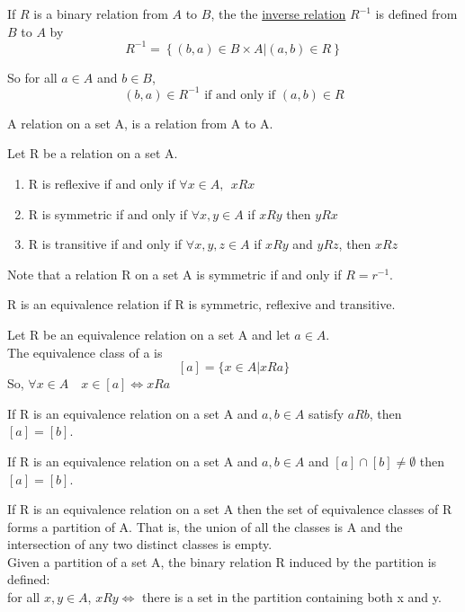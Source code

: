\begin{definition}
    If $R$ is a binary relation from $A$ to $B$, the the \underline{inverse relation} $R^{-1}$ is defined from $B$ to $A$ by $$R^{-1} = \left\{(b,a)\in B\times A | (a,b)\in R\right\}$$

    So for all $a\in A$ and $b\in B$, $$(b,a)\in R^{-1} \text{ if and only if }(a,b)\in R$$
\end{definition}
A relation on a set A, is a relation from A to A.\\
\newpage
\begin{definition}
    Let R be a relation on a set A.\\
    \begin{enumerate}
        \item R is reflexive if and only if \(\forall x \in A, ~~xRx\)
        \item R is symmetric if and only if \(\forall x,y \in A\) if \(xRy\) then \(yRx\)
        \item R is transitive if and only if \(\forall x,y,z \in A\) if \(xRy\) and \(yRz\), then \(xRz\)
    \end{enumerate}
\end{definition}
Note that a relation R on a set A is symmetric if and only if \(R = r^{-1}\).\\
\begin{definition}
    R is an equivalence relation if R is symmetric, reflexive and transitive.
\end{definition}
\begin{definition}
    Let R be an equivalence relation on a set A and let \(a \in A\).\\
    The equivalence class of a is \[[a] = \{x\in A | xRa\}\]
    So, \(\forall x\in A\quad x\in [a] \iff xRa\)
\end{definition}
\begin{theorm}
    If R is an equivalence relation on a set A and \(a, b \in A\) satisfy \(aRb\), then \([a] = [b]\).
\end{theorm}
\begin{theorm}
    If R is an equivalence relation on a set A and \(a, b \in A\) and \([a] \cap [b] \neq \emptyset\) then \([a] = [b]\).
\end{theorm}
\begin{theorm}
    If R is an equivalence relation on a set A then the set of equivalence classes of R forms a partition of A. That is, the union of all the classes is A and the intersection of any two distinct classes is empty.\\
    Given a partition of a set A, the binary relation R induced by the partition is defined:\\
    for all \(x, y \in A\), \(xRy \iff\) there is a set in the partition containing both x and y.
\end{theorm}
